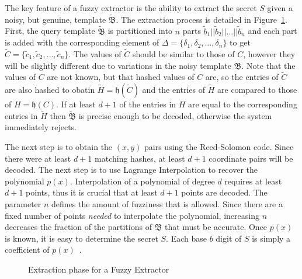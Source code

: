 \documentclass[11pt]{article}
\begin{document}
The key feature of a fuzzy extractor is the ability to extract the secret $S$ given a noisy, but genuine, template $\tilde{\mathfrak B}$. The extraction process is detailed in Figure~\ref{fig:extract}. First, the query template $\tilde{\mathfrak B}$ is partitioned into $n$ parts $\tilde b_1||\tilde b_2||\ldots||\tilde b_n$ and each part is added with the corresponding element of $\Delta = \{\delta_1, \delta_2,\ldots,\delta_n\}$ to get $\tilde C = \{\tilde c_1, \tilde c_2, \ldots, \tilde c_n\}$. The values of $\tilde C$ should be similar to those of $C$, however they will be slightly different due to variations in the noisy template $\mathfrak B$. Note that the values of $C$ are not known, but that hashed values of $C$ are, so the entries of $\tilde C$ are also hashed to obatin $\tilde H = \mathfrak h(\tilde C)$ and the entries of $\tilde H$ are compared to those of $H = \mathfrak h(C)$. If at least $d+1$ of the entries in $H$ are equal to the corresponding entries in $\tilde H$ then $\tilde{\mathfrak B}$ is precise enough to be decoded, otherwise the system immediately rejects.

The next step is to obtain the $(x, y)$ pairs using the Reed-Solomon code. Since there were at least $d+1$ matching hashes, at least $d+1$ coordinate pairs will be decoded. The next step is to use Lagrange Interpolation to recover the polynomial $p(x)$. Interpolation of a polynomial of degree $d$ requires at least $d+1$ points, thus it is crucial that at least $d+1$ points are decoded. The parameter $n$ defines the amount of fuzziness that is allowed. Since there are a fixed number of points \textit{needed} to interpolate the polynomial, increasing $n$ decreases the fraction of the partitions of $\mathfrak B$ that must be accurate. Once $p(x)$ is known, it is easy to determine the secret $S$. Each base $b$ digit of $S$ is simply a coefficient of $p(x)$~\cite{conf/csreaSAM/AlvarezEA09}.

\begin{figure}[h!]
\centering
{}
\caption{Extraction phase for a Fuzzy Extractor}
\label{fig:extract}
\end{figure}
\end{document}
